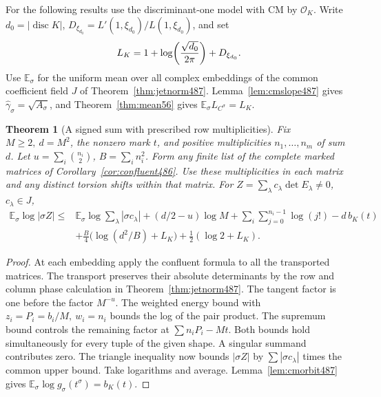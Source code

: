 \documentclass[a4paper,11pt]{article}
\newtheorem{theorem}[proposition]{Theorem}
\theoremstyle{definition}
\theoremstyle{remark}
\numberwithin{equation}{section}
\begin{document}
For the following results use the discriminant-one model with
CM by \(\mathcal O_K\). Write \(d_0=|\operatorname{disc}K|\),
\(D_{\xi_{d_0}}=L'(1,\xi_{d_0})/L(1,\xi_{d_0})\), and set
\[
 L_K=1+\log\!\left({\sqrt{d_0}\over2\pi}\right)+D_{\xi_{d_0}} .
\]
Use \(\mathbb E_\sigma\) for the uniform mean over all complex
embeddings of the common coefficient field \(J\) of
Theorem~\ref{thm:jetnorm487}. Lemma~\ref{lem:cmslope487} gives
\(\widehat\gamma_\sigma=\sqrt{A_\sigma}\), and
Theorem~\ref{thm:mean56} gives \(\mathbb E_\sigma L_{C^\sigma}=L_K\).

\begin{theorem}[A signed sum with prescribed row multiplicities]\leavevmode
\label{thm:signedcomplete488}
Fix \(M\ge2,\ d=M^2\), the nonzero mark \(t\), and positive
multiplicities \(n_1,\ldots,n_m\) of sum \(d\). Let
\(u=\sum_i\binom{n_i}{2}\), \(B=\sum_i n_i^2\). Form any finite
list of the complete marked matrices of
Corollary~\ref{cor:confluent486}. Use these multiplicities in each
matrix and any distinct torsion shifts within that matrix. For
\(Z=\sum_\lambda c_\lambda\det E_\lambda\ne0\), \(c_\lambda\in J\),
\[
 \begin{aligned}
 \mathbb E_\sigma\log|\sigma Z|
 \le{}&\mathbb E_\sigma\log\sum_\lambda|\sigma c_\lambda|
       +(d/2-u)\log M +\sum_i\sum_{j=0}^{n_i-1}\log(j!)
       -d\,b_K(t)\\
     &+\tfrac B4\bigl(\log(d^2/B)+L_K\bigr)
                         +\tfrac12(\log2+L_K).
 \end{aligned}
\]
\end{theorem}
\begin{proof}
At each embedding apply the confluent formula to all the
transported matrices. The transport preserves their absolute
determinants by the row and column phase calculation in
Theorem~\ref{thm:jetnorm487}. The tangent factor is one before
the factor \(M^{-u}\). The weighted energy bound with
\(z_i=P_i=b_i/M,\ w_i=n_i\) bounds the log of the pair product.
The supremum bound controls the remaining factor at
\(\sum n_iP_i-Mt\). Both bounds hold simultaneously for every
tuple of the given shape. A singular summand contributes zero.
The triangle inequality now bounds \(|\sigma Z|\) by
\(\sum|\sigma c_\lambda|\) times the common upper bound.
Take logarithms and average. Lemma~\ref{lem:cmorbit487} gives
\(\mathbb E_\sigma\log g_\sigma(t^\sigma)=b_K(t)\).
\end{proof}
\end{document}
